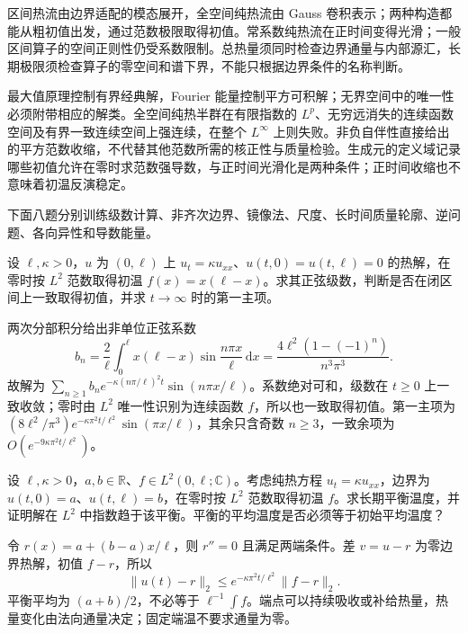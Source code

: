 



\begin{chaptersummary}
区间热流由边界适配的模态展开，全空间纯热流由 Gauss 卷积表示；两种构造都能从粗初值出发，通过范数极限取得初值。常系数纯热流在正时间变得光滑；一般区间算子的空间正则性仍受系数限制。总热量须同时检查边界通量与内部源汇，长期极限须检查算子的零空间和谱下界，不能只根据边界条件的名称判断。

\ProseParagraphBreak

最大值原理控制有界经典解，Fourier 能量控制平方可积解；无界空间中的唯一性必须附带相应的解类。全空间纯热半群在有限指数的 \(L^p\)、无穷远消失的连续函数空间及有界一致连续空间上强连续，在整个 \(L^\infty\) 上则失败。非负自伴性直接给出的平方范数收缩，不代替其他范数所需的核正性与质量检验。生成元的定义域记录哪些初值允许在零时求范数强导数，与正时间光滑化是两种条件；正时间收缩也不意味着初温反演稳定。
\end{chaptersummary}


\BookExercises

下面八题分别训练级数计算、非齐次边界、镜像法、尺度、长时间质量轮廓、逆问题、各向异性和导数能量。

\begin{exercise}\label{b2:ex:12-parabolic-profile}
设 \(\ell,\kappa>0\)，\(u\) 为 \((0,\ell)\) 上 \(u_t=\kappa u_{xx}\)、\(u(t,0)=u(t,\ell)=0\) 的热解，在零时按 \(L^2\) 范数取得初温 \(f(x)=x(\ell-x)\)。求其正弦级数，判断是否在闭区间上一致取得初值，并求 \(t\to\infty\) 时的第一主项。
\end{exercise}
\begin{solution}
两次分部积分给出非单位正弦系数
\[
 b_n=\dfrac2\ell\int_0^\ell x(\ell-x)\sin\dfrac{n\pi x}\ell\,\mathrm{d}x
 =\dfrac{4\ell^2(1-(-1)^n)}{n^3\pi^3}.
\]
故解为 \(\sum_{n\geq1}b_ne^{-\kappa(n\pi/\ell)^2t}\sin(n\pi x/\ell)\)。系数绝对可和，级数在 \(t\geq0\) 上一致收敛；零时由 \(L^2\) 唯一性识别为连续函数 \(f\)，所以也一致取得初值。第一主项为 \((8\ell^2/\pi^3)e^{-\kappa\pi^2t/\ell^2}\sin(\pi x/\ell)\)，其余只含奇数 \(n\geq3\)，一致余项为 \(O(e^{-9\kappa\pi^2t/\ell^2})\)。
\end{solution}

\begin{exercise}\label{b2:ex:12-affine-equilibrium}
设 \(\ell,\kappa>0\)，\(a,b\in\mathbb R\)、\(f\in L^2(0,\ell;\mathbb C)\)。考虑纯热方程 \(u_t=\kappa u_{xx}\)，边界为 \(u(t,0)=a\)、\(u(t,\ell)=b\)，在零时按 \(L^2\) 范数取得初温 \(f\)。求长期平衡温度，并证明解在 \(L^2\) 中指数趋于该平衡。平衡的平均温度是否必须等于初始平均温度？
\end{exercise}
\begin{solution}
令 \(r(x)=a+(b-a)x/\ell\)，则 \(r''=0\) 且满足两端条件。差 \(v=u-r\) 为零边界热解，初值 \(f-r\)，所以
\[
 \|u(t)-r\|_2\leq e^{-\kappa\pi^2t/\ell^2}\|f-r\|_2.
\]
平衡平均为 \((a+b)/2\)，不必等于 \(\ell^{-1}\int f\)。端点可以持续吸收或补给热量，热量变化由法向通量决定；固定端温不要求通量为零。
\end{solution}

